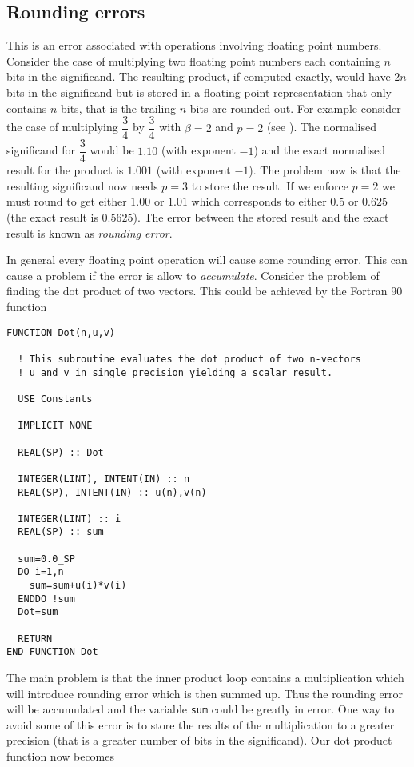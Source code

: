 \subsection{Rounding errors}

This is an error associated with operations involving floating point
numbers.  Consider the case of multiplying two floating point numbers
each containing $n$ bits in the significand. The resulting product, if
computed exactly, would have $2n$ bits in the significand but is
stored in a floating point representation that only contains $n$ bits,
that is the trailing $n$ bits are rounded out. For example consider
the case of multiplying $\dfrac{3}{4}$ by $\dfrac{3}{4}$ with
$\beta=2$ and $p=2$ (see
). The normalised
significand for $\dfrac{3}{4}$ would be $1.10$ (with exponent $-1$)
and the exact normalised result for the product is $1.001$ (with
exponent $-1$). The problem now is that the resulting significand now
needs $p=3$ to store the result. If we enforce $p=2$ we must round to
get either $1.00$ or $1.01$ which corresponds to either $0.5$ or
$0.625$ (the exact result is $0.5625$). The error between the stored
result and the exact result is known as \emph{rounding error}.

In general every floating point operation will cause some rounding error. This
can cause a problem if the error is allow to \emph{accumulate}.  Consider the
problem of finding the dot product of two vectors. This could be achieved by
the Fortran 90 function

\footnotesize
\begin{verbatim}
FUNCTION Dot(n,u,v)

  ! This subroutine evaluates the dot product of two n-vectors
  ! u and v in single precision yielding a scalar result.

  USE Constants

  IMPLICIT NONE

  REAL(SP) :: Dot

  INTEGER(LINT), INTENT(IN) :: n
  REAL(SP), INTENT(IN) :: u(n),v(n)

  INTEGER(LINT) :: i
  REAL(SP) :: sum

  sum=0.0_SP
  DO i=1,n
    sum=sum+u(i)*v(i)
  ENDDO !sum
  Dot=sum

  RETURN
END FUNCTION Dot
\end{verbatim}
\normalsize

The main problem is that the inner product loop contains a multiplication
which will introduce rounding error which is then summed up. Thus the rounding
error will be accumulated and the variable \texttt{sum} could be greatly in
error.  One way to avoid some of this error is to store the results of the
multiplication to a greater precision (that is a greater number of bits in the
significand). Our dot product function now becomes

